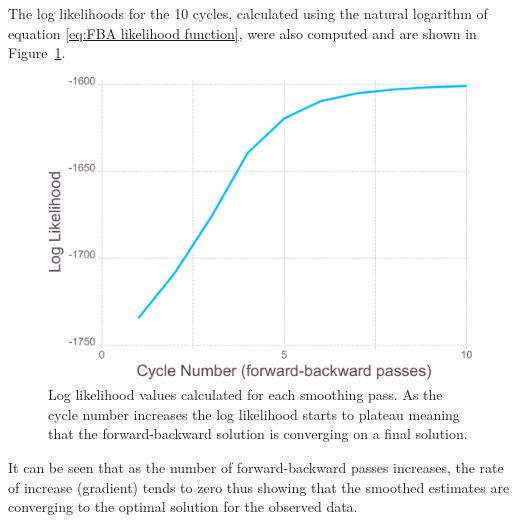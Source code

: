 The log likelihoods for the 10 cycles, calculated using the natural logarithm of equation \ref{eq:FBA likelihood function}, were also computed and are shown in Figure~\ref{fig:Simulation Log likelihood - good}.
\begin{figure}[ht!]
    \centering
    \includegraphics[width=1.0\textwidth]{figures/datared/loglik.pdf}
    \caption[Log likelihood values calculated at the end of each smoothing pass for a strong reflection.]{Log likelihood values calculated for each smoothing pass.
    As the cycle number increases the log likelihood starts to plateau meaning that the forward-backward solution is converging on a final solution.}
    \label{fig:Simulation Log likelihood - good}
\end{figure}

It can be seen that as the number of forward-backward passes increases, the rate of increase (gradient) tends to zero thus showing that the smoothed estimates are converging to the optimal solution for the observed data.

